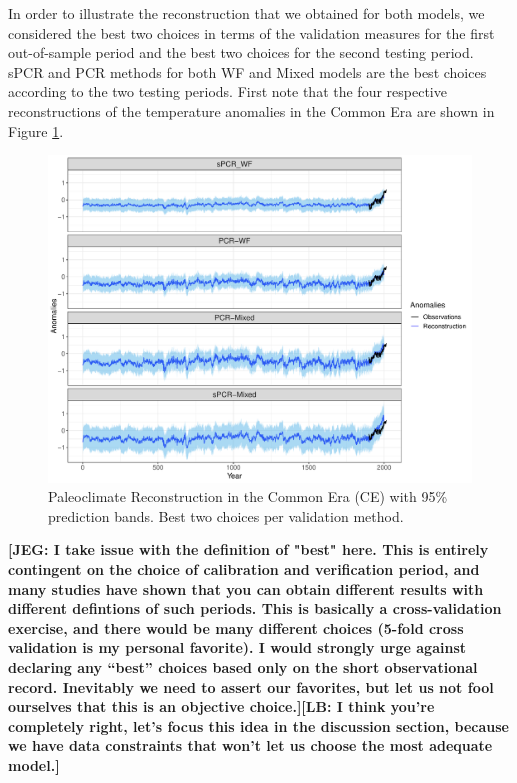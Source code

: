 \documentclass[12pt]{amsart}
\theoremstyle{plain}
\theoremstyle{definition}
\theoremstyle{remark}
\newcommand{\lb}[1]{\color{MidnightBlue}\textbf{[LB: #1]}\normalcolor}
\newcommand{\jeg}[1]{\color{ProcessBlue}\textbf{[JEG: #1]}\normalcolor}
\begin{document}
In order to illustrate the reconstruction that we obtained for both models, we
considered the best two choices in terms of the validation measures for the
first out-of-sample period  and the best two choices for the second testing
period. sPCR and PCR methods for both WF and Mixed models are the best choices
according to the two testing periods. First note that the four respective reconstructions of the
temperature anomalies in the Common Era are shown in
Figure \ref{fig:paleoCE1}.
\begin{figure}
  \centering
  \includegraphics[scale=0.55]{RecCE_Final}
  \caption{Paleoclimate Reconstruction in the Common Era (CE) with 95\%
    prediction bands. Best two choices per validation method.}
  \label{fig:paleoCE1}
\end{figure}

\jeg{I take issue with the definition of "best" here. This is entirely
  contingent on the choice of calibration and verification period, and many
  studies have shown that you can obtain different results with different
  defintions of such periods. This is basically a cross-validation exercise, and
  there would be many different choices (5-fold cross validation is my personal
  favorite). I would strongly urge against declaring any ``best'' choices based
  only on the short observational record. Inevitably we need to assert our
  favorites, but let us not fool ourselves that this is an objective
  choice.}\lb{I think you're completely right, let's focus this idea in the
  discussion section, because we have data constraints that won't let us choose
  the most adequate model.}
\end{document}

